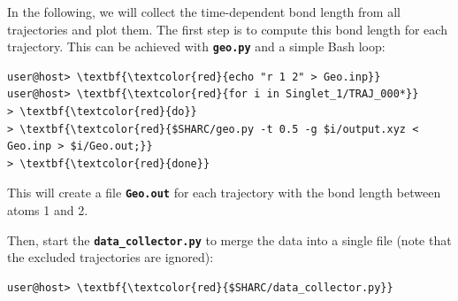 \documentclass[a4paper,11pt,DIV=15,openany]{scrbook}
\newcommand{\ttt}[1]{\textbf{\texttt{#1}}}
\begin{document}
In the following, we will collect the time-dependent  bond length from all trajectories and plot them.
The first step is to compute this bond length for each trajectory.
This can be achieved with \ttt{geo.py} and a simple Bash loop:
\begin{Verbatim}[commandchars=\\\{\}]
user@host> \textbf{\textcolor{red}{echo "r 1 2" > Geo.inp}}
user@host> \textbf{\textcolor{red}{for i in Singlet_1/TRAJ_000*}}
> \textbf{\textcolor{red}{do}}
> \textbf{\textcolor{red}{$SHARC/geo.py -t 0.5 -g $i/output.xyz < Geo.inp > $i/Geo.out;}}
> \textbf{\textcolor{red}{done}}
\end{Verbatim}
This will create a file \ttt{Geo.out} for each trajectory with the bond length between atoms 1 and 2.

Then, start the \ttt{data\_collector.py} to merge the data into a single file (note that the excluded trajectories are ignored):
\begin{Verbatim}[commandchars=\\\{\}]
user@host> \textbf{\textcolor{red}{$SHARC/data_collector.py}}
\end{Verbatim}
\end{document}
